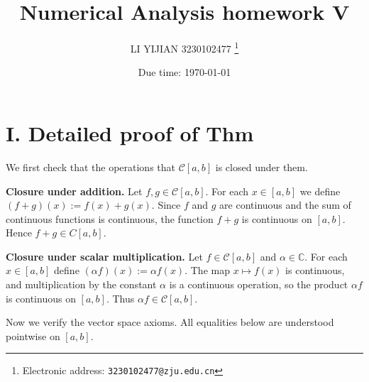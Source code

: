 \documentclass[a4paper]{article}
\begin{document}
\title{Numerical Analysis homework V}

\author{LI YIJIAN 3230102477
  \thanks{Electronic address: \texttt{3230102477@zju.edu.cn}}}


\date{Due time: \today}
\maketitle





\section*{I. Detailed proof of Thm}
We first check that the operations that
\(\mathcal{C}[a,b]\) is closed under them.

\medskip\noindent
\textbf{Closure under addition.}
Let \(f,g\in \mathcal{C} [a,b]\).  
For each \(x\in[a,b]\) we define
\((f+g)(x):=f(x)+g(x)\).
Since \(f\) and \(g\) are continuous and the sum of continuous
functions is continuous, the function \(f+g\) is continuous on \([a,b]\).
Hence \(f+g\in C[a,b]\).

\medskip\noindent
\textbf{Closure under scalar multiplication.}
Let \(f\in \mathcal{C}[a,b]\) and \(\alpha\in\mathbb{C}\).
For each \(x\in[a,b]\) define
\((\alpha f)(x):=\alpha f(x)\).
The map \(x\mapsto f(x)\) is continuous, and multiplication by the
constant \(\alpha\) is a continuous operation, so the product
\(\alpha f\) is continuous on \([a,b]\).
Thus \(\alpha f\in \mathcal{C}[a,b]\).

\medskip
Now we verify the vector space axioms.
All equalities below are understood pointwise on \([a,b]\).
\end{document}
